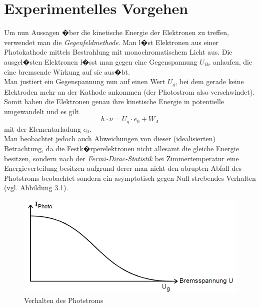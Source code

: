 \documentclass[a4paper, 10pt]{report}%
\begin{document}
\chapter{Experimentelles Vorgehen}
Um nun Aussagen �ber die kinetische Energie der Elektronen zu treffen, verwendet man die \textit{Gegenfeldmethode}. Man l�st Elektronen aus einer Photokathode mittels Bestrahlung mit monochromatischem Licht aus. Die ausgel�sten Elektronen l�sst man gegen eine Gegenspannung $U_{Br}$ anlaufen, die eine bremsende Wirkung auf sie aus�bt.\\
Man justiert ein Gegenspannung nun auf einen Wert $U_g$, bei dem gerade keine Elektroden mehr an der Kathode ankommen (der Photostrom also verschwindet). Somit haben die Elektronen genau ihre kinetische Energie in potentielle umgewandelt und es gilt
\begin{equation}
h \cdot \nu = U_{g} \cdot e_0 + W_A
\end{equation}
mit der Elementarladung $e_0$.\\
Man beobachtet jedoch auch Abweichungen von dieser (idealisierten) Betrachtung, da die Festk�rperelektronen nicht allesamt die gleiche Energie besitzen, sondern nach der \textit{Fermi-Dirac-Statistik} bei Zimmertemperatur eine Energieverteilung besitzen aufgrund derer man nicht den abrupten Abfall des Photstroms beobachtet sondern ein asymptotisch gegen Null strebendes Verhalten (vgl. Abbildung 3.1).
\begin{figure}[!htbp]
	\begin{center}
		\includegraphics[scale = 0.4]{photostrom}
	\end{center}
	\caption{Verhalten des Photstroms}
	\label{fig:abbildung2}
\end{figure}
\end{document}
